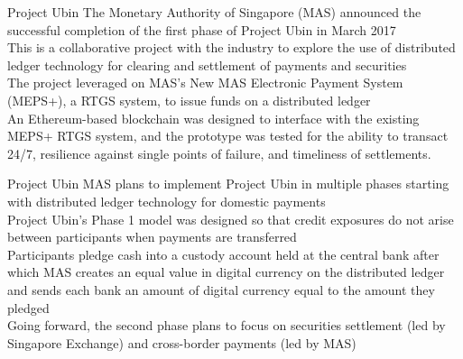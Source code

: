 \documentclass[9pt]{beamer}
\begin{document}
\begin{frame}{Project Ubin}
	The Monetary Authority of Singapore (MAS) announced the successful completion of the first phase of Project Ubin in March 2017\\ \vspace{3mm}
	This is a collaborative project with the industry to explore the use of distributed ledger technology for clearing and settlement of payments and securities \\ \vspace{3mm}
	The project leveraged on MAS's New MAS Electronic Payment System (MEPS+), a RTGS system, to issue funds on a distributed ledger \\ \vspace{3mm}
	An Ethereum-based blockchain was designed to interface with the existing MEPS+ RTGS system, and the prototype was tested for the ability to transact 24/7, resilience against single points of failure, and timeliness of settlements.
\end{frame}


\begin{frame}{Project Ubin}
	MAS plans to implement Project Ubin in multiple phases starting with distributed ledger technology for domestic payments\\ \vspace{3mm}
	Project Ubin's Phase 1 model was designed so that credit exposures do not arise between participants when payments are transferred\\ \vspace{3mm}
	Participants pledge cash into a custody account held at the central bank after which MAS creates an equal value in digital currency on the distributed ledger and sends each bank an amount of digital currency equal to the amount they pledged\\ \vspace{3mm}
	Going forward, the second phase plans to focus on securities settlement (led by Singapore Exchange) and cross-border payments (led by MAS)
\end{frame}

\end{document}
